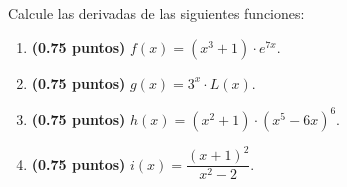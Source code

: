 
Calcule las derivadas de las siguientes funciones:
\begin{enumerate}[label=\alph*)]
\item \textbf{(0.75 puntos)} $f(x)=(x^3+1)\cdot e^{7x}$.
\item \textbf{(0.75 puntos)} $g(x)=3^x\cdot L(x)$.
\item \textbf{(0.75 puntos)} $h(x)=(x^2+1)\cdot(x^5-6x)^6$.
\item \textbf{(0.75 puntos)} $i(x)=\dfrac{(x+1)^2}{x^2-2}$.
\end{enumerate}
